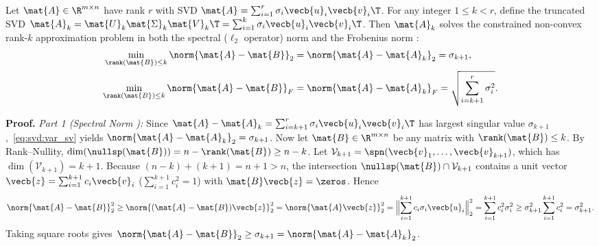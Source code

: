 \documentclass[../../../../master.tex]{subfiles}
\begin{document}
\begin{coremath}
\label{thm:svd:eckart}
Let $\mat{A} \in \R^{m \times n}$ have rank $r$ with SVD $\mat{A} = \sum_{i=1}^r \sigma_i \vecb{u}_i \vecb{v}_i\T$. For any integer $1 \le k < r$, define the truncated SVD $\mat{A}_k = \mat{U}_k\mat{\Sigma}_k\mat{V}_k\T = \sum_{i=1}^k \sigma_i \vecb{u}_i \vecb{v}_i\T$. Then $\mat{A}_k$ solves the constrained non-convex rank-$k$ approximation problem in both the spectral ($\ell_2$ operator) norm and the Frobenius norm  :
\begin{align}
  \min_{\rank(\mat{B}) \le k} \norm{\mat{A} - \mat{B}}_2 &= \norm{\mat{A} - \mat{A}_k}_2 = \sigma_{k+1}, \label{eq:svd:ey_spec} \\
  \min_{\rank(\mat{B}) \le k} \norm{\mat{A} - \mat{B}}_F &= \norm{\mat{A} - \mat{A}_k}_F = \sqrt{\sum_{i=k+1}^r \sigma_i^2}. \label{eq:svd:ey_frob}
\end{align}

\textbf{Proof.}
\emph{Part 1 (Spectral Norm ):} Since $\mat{A} - \mat{A}_k = \sum_{i=k+1}^r \sigma_i \vecb{u}_i\vecb{v}_i\T$ has largest singular value $\sigma_{k+1}$,~\eqref{eq:svd:var_sv} yields $\norm{\mat{A} - \mat{A}_k}_2 = \sigma_{k+1}$. Now let $\mat{B} \in \R^{m \times n}$ be any matrix with $\rank(\mat{B}) \le k$. By Rank--Nullity, $\dim(\nullsp(\mat{B})) = n - \rank(\mat{B}) \ge n - k$. Let $\mathcal{V}_{k+1} = \spn(\vecb{v}_1,\dots,\vecb{v}_{k+1})$, which has $\dim(\mathcal{V}_{k+1}) = k + 1$. Because $(n-k) + (k+1) = n + 1 > n$, the intersection $\nullsp(\mat{B}) \cap \mathcal{V}_{k+1}$ contains a unit vector $\vecb{z} = \sum_{i=1}^{k+1} c_i \vecb{v}_i$ ($\sum_{i=1}^{k+1} c_i^2 = 1$) with $\mat{B}\vecb{z} = \zeros$. Hence
\[
  \norm{\mat{A} - \mat{B}}_2^2 \ge \norm{(\mat{A} - \mat{B})\vecb{z}}_2^2 = \norm{\mat{A}\vecb{z}}_2^2 = \Bigl\lVert \sum_{i=1}^{k+1} c_i \sigma_i \vecb{u}_i \Bigr\rVert_2^2 = \sum_{i=1}^{k+1} c_i^2 \sigma_i^2 \ge \sigma_{k+1}^2 \sum_{i=1}^{k+1} c_i^2 = \sigma_{k+1}^2.
\]
Taking square roots gives $\norm{\mat{A} - \mat{B}}_2 \ge \sigma_{k+1} = \norm{\mat{A} - \mat{A}_k}_2$.


\end{coremath}
\end{document}
